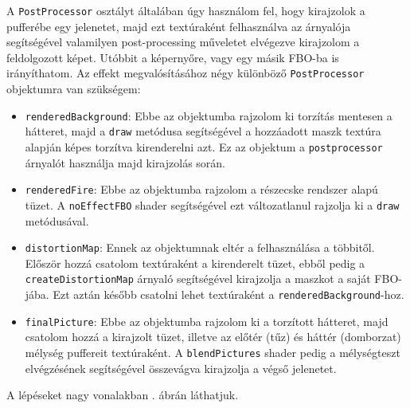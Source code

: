 A \texttt{PostProcessor} osztályt általában úgy használom fel, hogy kirajzolok a pufferébe egy jelenetet, majd ezt textúraként felhasználva az árnyalója segítségével valamilyen post-processing műveletet elvégezve kirajzolom a feldolgozott képet. Utóbbit a képernyőre, vagy egy másik FBO-ba is irányíthatom. Az effekt megvalósításához négy különböző \texttt{PostProcessor} objektumra van szükségem:
\begin{itemize}
\item  \texttt{renderedBackground}: Ebbe az objektumba rajzolom ki torzítás mentesen a hátteret, majd a \texttt{draw} metódusa segítségével a hozzáadott maszk textúra alapján képes torzítva kirenderelni azt. Ez az objektum a \texttt{postprocessor} árnyalót használja majd kirajzolás során.
\item \texttt{renderedFire}: Ebbe az objektumba rajzolom a részecske rendszer alapú tüzet. A \texttt{noEffectFBO} shader segítségével ezt változatlanul rajzolja ki a \texttt{draw} metódusával.
\item \texttt{distortionMap}: Ennek az objektumnak eltér a felhasználása a többitől. Először hozzá csatolom textúraként a kirenderelt tüzet, ebből pedig a \texttt{createDistortion\-Map} árnyaló segítségével kirajzolja a maszkot a saját FBO-jába. Ezt aztán később csatolni lehet textúraként a \texttt{renderedBackground}-hoz.
\item \texttt{finalPicture}: Ebbe az objektumba rajzolom ki a torzított hátteret, majd csatolom hozzá a kirajzolt tüzet, illetve az előtér (tűz) és háttér (domborzat) mélység puffereit textúraként. A \texttt{blendPictures} shader pedig a mélységteszt elvégzésének segítségével összevágva kirajzolja a végső jelenetet.
\end{itemize}
A lépéseket nagy vonalakban . ábrán láthatjuk.
